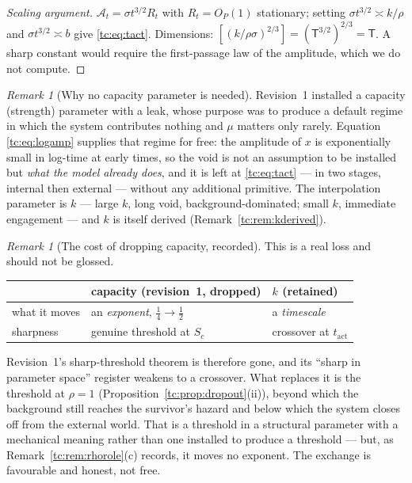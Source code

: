 \documentclass[11pt]{article}
\numberwithin{equation}{section}
\theoremstyle{plain}
\theoremstyle{definition}
\theoremstyle{remark}
\newtheorem{remark}[theorem]{Remark}
\newcommand{\Ac}{\mathcal{A}}
\begin{document}
\begin{proof}[Scaling argument]
$\Ac_t=\sigma t^{3/2}R_t$ with $R_t=O_P(1)$ stationary; setting
$\sigma t^{3/2}\asymp k/\rho$ and $\sigma t^{3/2}\asymp b$ give
\eqref{tc:eq:tact}. Dimensions:
$[(k/\rho\sigma)^{2/3}]=(\mathsf T^{3/2})^{2/3}=\mathsf T$. A sharp
constant would require the first-passage law of the amplitude, which we
do not compute.
\end{proof}

\begin{remark}[Why no capacity parameter is needed]
\label{tc:rem:nocapacity}
Revision~1 installed a capacity (strength) parameter with a leak, whose
purpose was to produce a default regime in which the system contributes
nothing and $\mu$ matters only rarely. Equation \eqref{tc:eq:logamp}
supplies that regime for free: the amplitude of $x$ is exponentially
small in log-time at early times, so the void is not an assumption to be
installed but \emph{what the model already does}, and it is left at
\eqref{tc:eq:tact} --- in two stages, internal then external --- without
any additional primitive. The interpolation
parameter is $k$ --- large $k$, long void, background-dominated; small
$k$, immediate engagement --- and $k$ is itself derived
(Remark~\ref{tc:rem:kderived}).
\end{remark}

\begin{remark}[The cost of dropping capacity, recorded]
\label{tc:rem:cost}
This is a real loss and should not be glossed.
\begin{center}\small
\begin{tabular}{@{}lll@{}}
\toprule
& capacity (revision~1, dropped) & $k$ (retained)\\
\midrule
what it moves & an \emph{exponent}, $\tfrac14\to\tfrac12$ &
a \emph{timescale}\\
sharpness & genuine threshold at $S_c$ & crossover at
$t_{\mathrm{act}}$\\
\bottomrule
\end{tabular}
\end{center}
Revision~1's sharp-threshold theorem is therefore gone, and its ``sharp
in parameter space'' register weakens to a crossover. What replaces it
is the threshold at $\rho=1$
(Proposition~\ref{tc:prop:dropout}(ii)), beyond which the background
still reaches the survivor's hazard and below which the system closes
off from the external world. That is a threshold in a structural
parameter with a mechanical meaning rather than one installed to produce
a threshold --- but, as Remark~\ref{tc:rem:rhorole}(c) records, it moves
no exponent. The exchange is favourable and honest, not free.
\end{remark}
\end{document}
